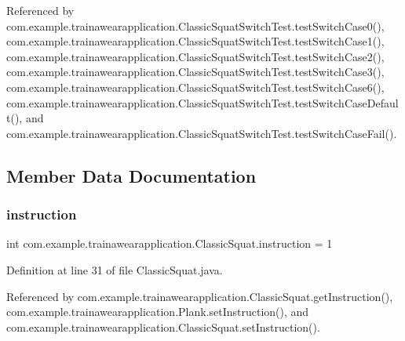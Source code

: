 Referenced by com.\+example.\+trainawearapplication.\+Classic\+Squat\+Switch\+Test.\+test\+Switch\+Case0(), com.\+example.\+trainawearapplication.\+Classic\+Squat\+Switch\+Test.\+test\+Switch\+Case1(), com.\+example.\+trainawearapplication.\+Classic\+Squat\+Switch\+Test.\+test\+Switch\+Case2(), com.\+example.\+trainawearapplication.\+Classic\+Squat\+Switch\+Test.\+test\+Switch\+Case3(), com.\+example.\+trainawearapplication.\+Classic\+Squat\+Switch\+Test.\+test\+Switch\+Case6(), com.\+example.\+trainawearapplication.\+Classic\+Squat\+Switch\+Test.\+test\+Switch\+Case\+Default(), and com.\+example.\+trainawearapplication.\+Classic\+Squat\+Switch\+Test.\+test\+Switch\+Case\+Fail().



\subsection{Member Data Documentation}
\mbox{\label{classcom_1_1example_1_1trainawearapplication_1_1_classic_squat_a3cbf1db0a5560d931ebdaa407a1a6285}} 
\subsubsection{\texorpdfstring{instruction}{instruction}}
{\footnotesize\ttfamily int com.\+example.\+trainawearapplication.\+Classic\+Squat.\+instruction = 1\hspace{0.3cm}{\ttfamily [static]}}



Definition at line 31 of file Classic\+Squat.\+java.



Referenced by com.\+example.\+trainawearapplication.\+Classic\+Squat.\+get\+Instruction(), com.\+example.\+trainawearapplication.\+Plank.\+set\+Instruction(), and com.\+example.\+trainawearapplication.\+Classic\+Squat.\+set\+Instruction().

\mbox{\label{classcom_1_1example_1_1trainawearapplication_1_1_classic_squat_a28250169a237362b6ab0a7412cd12da6}} 

